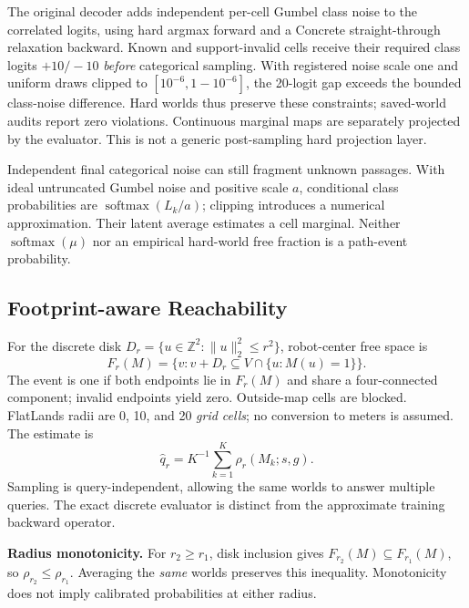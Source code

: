 \documentclass[conference,letterpaper,10pt]{IEEEtran}
\begin{document}
The original decoder adds independent per-cell Gumbel class noise to the correlated logits, using hard argmax forward and a Concrete straight-through relaxation backward. Known and support-invalid cells receive their required class logits $+10/-10$ \emph{before} categorical sampling. With registered noise scale one and uniform draws clipped to $[10^{-6},1-10^{-6}]$, the 20-logit gap exceeds the bounded class-noise difference. Hard worlds thus preserve these constraints; saved-world audits report zero violations. Continuous marginal maps are separately projected by the evaluator. This is not a generic post-sampling hard projection layer.

Independent final categorical noise can still fragment unknown passages. With ideal untruncated Gumbel noise and positive scale $a$, conditional class probabilities are $\operatorname{softmax}(L_k/a)$; clipping introduces a numerical approximation. Their latent average estimates a cell marginal. Neither $\operatorname{softmax}(\mu)$ nor an empirical hard-world free fraction is a path-event probability.

\subsection{Footprint-aware Reachability}
For the discrete disk $D_r=\{u\in\mathbb Z^2:\|u\|_2^2\leq r^2\}$, robot-center free space is
\begin{equation}
 F_r(M)=\{v:v+D_r\subseteq V\cap\{u:M(u)=1\}\}.
\end{equation}
The event is one if both endpoints lie in $F_r(M)$ and share a four-connected component; invalid endpoints yield zero. Outside-map cells are blocked. FlatLands radii are 0, 10, and 20 \emph{grid cells}; no conversion to meters is assumed. The estimate is
\begin{equation}
 \widehat q_r=K^{-1}\sum_{k=1}^{K}\rho_r(M_k;s,g).
\end{equation}
Sampling is query-independent, allowing the same worlds to answer multiple queries. The exact discrete evaluator is distinct from the approximate training backward operator.

\textbf{Radius monotonicity.} For $r_2\geq r_1$, disk inclusion gives $F_{r_2}(M)\subseteq F_{r_1}(M)$, so $\rho_{r_2}\leq\rho_{r_1}$. Averaging the \emph{same} worlds preserves this inequality. Monotonicity does not imply calibrated probabilities at either radius.
\end{document}
